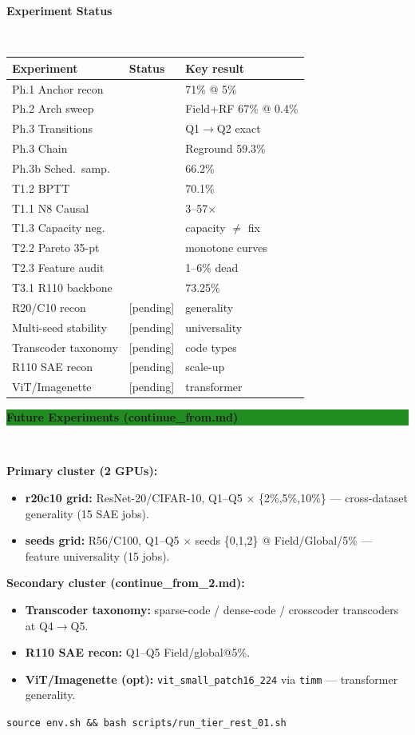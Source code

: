 \documentclass[a0,landscape,final]{a0poster}
\newlength{\colwidth}
\newcommand{\posterblock}[2]{%
  \vspace{0.35cm}%
  \noindent\colorbox{NavyBlue}{\parbox{\dimexpr\colwidth-2\fboxsep}{%
    \color{white}\large\bfseries\vspace{2pt} #1\vspace{2pt}%
  }}\\[-1pt]%
  \noindent\colorbox{PanelBg}{\parbox{\dimexpr\colwidth-2\fboxsep}{%
    \vspace{4pt}#2\vspace{4pt}%
  }}%
  \vspace{0.2cm}%
}
\newcommand{\exampleblock}[2]{%
  \vspace{0.35cm}%
  \noindent\colorbox{ForestGreen}{\parbox{\dimexpr\colwidth-2\fboxsep}{%
    \color{white}\large\bfseries\vspace{2pt} #1\vspace{2pt}%
  }}\\[-1pt]%
  \noindent\colorbox{VeryLightGreen}{\parbox{\dimexpr\colwidth-2\fboxsep}{%
    \vspace{4pt}#2\vspace{4pt}%
  }}%
  \vspace{0.2cm}%
}
\newcommand{\yes}{\textcolor{ForestGreen}{\checkmark}}
\newcommand{\pend}{\textcolor{GoldenBrown}{[pending]}}
\begin{document}
\posterblock{Experiment Status}{%
\normalsize
\begin{center}
\begin{tabular}{@{}p{4.4cm}ll@{}}
\toprule
\textbf{Experiment} & \textbf{Status} & \textbf{Key result}\\
\midrule
Ph.1 Anchor recon   & \yes & 71\% @ 5\%\\
Ph.2 Arch sweep     & \yes & Field+RF 67\% @ 0.4\%\\
Ph.3 Transitions    & \yes & Q1$\to$Q2 exact\\
Ph.3 Chain          & \yes & Reground 59.3\%\\
Ph.3b Sched.\ samp. & \yes & 66.2\%\\
T1.2 BPTT           & \yes & 70.1\%\\
T1.1 N8 Causal      & \yes & 3--57$\times$\\
T1.3 Capacity neg.  & \yes & capacity $\neq$ fix\\
T2.2 Pareto 35-pt   & \yes & monotone curves\\
T2.3 Feature audit  & \yes & 1--6\% dead\\
T3.1 R110 backbone  & \yes & 73.25\%\\
\midrule
R20/C10 recon       & \pend & generality\\
Multi-seed stability& \pend & universality\\
Transcoder taxonomy & \pend & code types\\
R110 SAE recon      & \pend & scale-up\\
ViT/Imagenette      & \pend & transformer\\
\bottomrule
\end{tabular}
\end{center}
}

\exampleblock{Future Experiments (continue\_from.md)}{%
\normalsize
\textbf{Primary cluster (2 GPUs):}
\begin{itemize}
  \item \textbf{r20c10 grid:} ResNet-20/CIFAR-10, Q1--Q5 $\times$
        \{2\%,5\%,10\%\} — cross-dataset generality (15 SAE jobs).
  \item \textbf{seeds grid:} R56/C100, Q1--Q5 $\times$ seeds \{0,1,2\}
        @ Field/Global/5\% — feature universality (15 jobs).
\end{itemize}
\textbf{Secondary cluster (continue\_from\_2.md):}
\begin{itemize}
  \item \textbf{Transcoder taxonomy:} sparse-code / dense-code /
        crosscoder transcoders at Q4$\to$Q5.
  \item \textbf{R110 SAE recon:} Q1--Q5 Field/global@5\%.
  \item \textbf{ViT/Imagenette (opt):} \texttt{vit\_small\_patch16\_224}
        via \texttt{timm} — transformer generality.
\end{itemize}
\texttt{source env.sh \&\& bash scripts/run\_tier\_rest\_01.sh}
}
\end{document}
